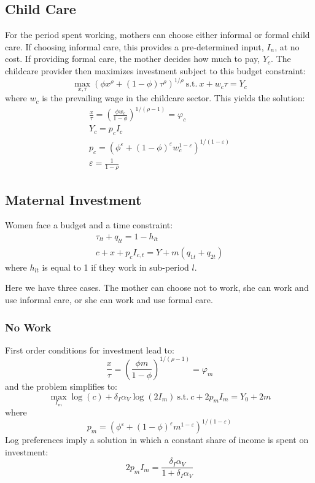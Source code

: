 \documentclass[12pt]{article}
\numberwithin{equation}{section}
\numberwithin{figure}{section}
\numberwithin{table}{section}
\begin{document}
\subsection{Child Care}
For the period spent working, mothers can choose either informal or formal child care. If choosing informal care, this provides a pre-determined input, $I_n$, at no cost. If providing formal care, the mother decides how much to pay, $Y_c$. The childcare provider then maximizes investment subject to this budget constraint:
\[\max_{x,\tau}\left(\phi x^\rho + (1-\phi)\tau^\rho\right)^{1/\rho}\ \text{s.t.}\ x + w_c\tau = Y_c \]
where $w_c$ is the prevailing wage in the childcare sector.
This yields the solution:
\begin{eqnarray}
\frac{x}{\tau} = \left(\frac{\phi w_c}{1-\phi}\right)^{1/(\rho-1)} = \varphi_c \\
Y_c = p_cI_c \\
p_c = \left(\phi^\varepsilon + (1-\phi)^\varepsilon w_c^{1-\varepsilon}\right)^{1/(1-\varepsilon)} \\
\varepsilon = \frac{1}{1-\rho}
\end{eqnarray}

\subsection{Maternal Investment}
Women face a budget and a time constraint:
\begin{eqnarray}
\tau_{lt} + q_{lt} = 1-h_{lt} \\
c + x + p_c I_{c,t} = Y + m(q_{1t} + q_{2t})
\end{eqnarray}
where $h_{lt}$ is equal to 1 if they work in sub-period $l$.

Here we have three cases. The mother can choose not to work, she can work and use informal care, or she can work and use formal care.

\subsubsection{No Work}
First order conditions for investment lead to:
\begin{equation}
\frac{x}{\tau} = \left(\frac{\phi m}{1-\phi}\right)^{1/(\rho-1)} = \varphi_m
\end{equation}
and the problem simplifies to:
\[\max_{I_m} \log(c) + \delta_{I}\alpha_{V}\log(2I_m)\ \text{s.t.}\ c + 2p_mI_m = Y_0 + 2m \]
where
\[p_m = \left(\phi^\varepsilon + (1-\phi)^\varepsilon m^{1-\varepsilon}\right)^{1/(1-\varepsilon)} \]
Log preferences imply a solution in which a constant share of income is spent on investment:
\[ 2p_m I_m = \frac{\delta_I\alpha_V}{1+\delta_{I}\alpha_V} \]
\end{document}
